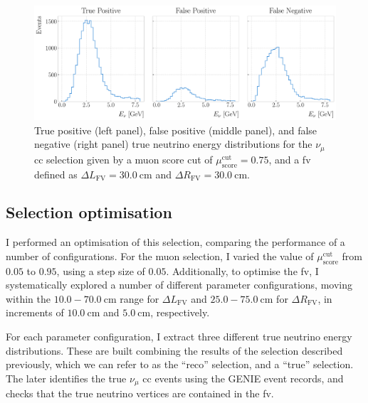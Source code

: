 \begin{figure}[t]
    \centering
    \includegraphics[width=.99\linewidth]{Images/GAr_selection/true_numu_example_spectra_horizontal.pdf}
    \caption[True positive, false positive, and false negative true neutrino energy distributions for a $\nu_{\mu}$ \gls{cc} selection.]{True positive (left panel), false positive (middle panel), and false negative (right panel) true neutrino energy distributions for the $\nu_{\mu}$ \gls{cc} selection given by a muon score cut of $\mu_{\mathrm{score}}^{\mathrm{cut}} = 0.75$, and a \gls{fv} defined as $\Delta L_{\mathrm{FV}} = 30.0 ~ \mathrm{cm}$ and $\Delta R_{\mathrm{FV}} = 30.0 ~ \mathrm{cm}$.}
    \label{fig:numuCC_spectra_example}
\end{figure}

\subsection{Selection optimisation}

I performed an optimisation of this selection, comparing the performance of a number of configurations. For the muon selection, I varied the value of $\mu_{\mathrm{score}}^{\mathrm{cut}}$ from $0.05$ to $0.95$, using a step size of $0.05$. Additionally, to optimise the \gls{fv}, I systematically explored a number of different parameter configurations, moving within the $10.0-70.0~\mathrm{cm}$ range for $\Delta L_{\mathrm{FV}}$ and $25.0-75.0~\mathrm{cm}$ for $\Delta R_{\mathrm{FV}}$, in increments of $10.0~\mathrm{cm}$ and $5.0~\mathrm{cm}$, respectively.

For each parameter configuration, I extract three different true neutrino energy distributions. These are built combining the results of the selection described previously, which we can refer to as the ``reco'' selection, and a ``true'' selection. The later identifies the true $\nu_{\mu}$ \gls{cc} events using the GENIE event records, and checks that the true neutrino vertices are contained in the \gls{fv}.

